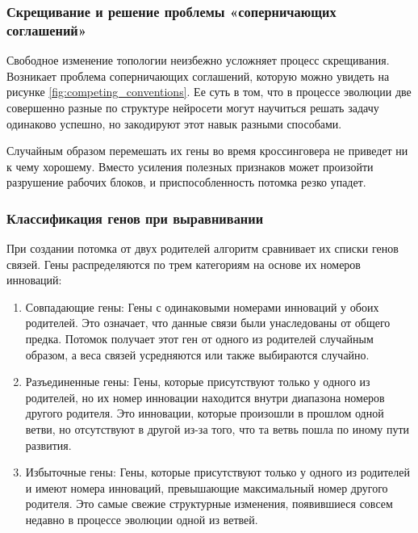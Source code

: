 \subsubsection{Скрещивание и решение проблемы «соперничающих соглашений»}



Свободное изменение топологии неизбежно усложняет процесс скрещивания. Возникает проблема соперничающих соглашений, которую можно увидеть на рисунке \ref{fig:competing_conventions}. Ее суть в том, что в процессе эволюции две совершенно разные по структуре нейросети могут научиться решать задачу одинаково успешно, но закодируют этот навык разными способами.

Случайным образом перемешать их гены во время кроссинговера не приведет ни к чему хорошему. Вместо усиления полезных признаков может произойти разрушение рабочих блоков, и приспособленность потомка резко упадет.

\subsubsection{Классификация генов при выравнивании}

При создании потомка от двух родителей алгоритм сравнивает их списки генов связей. Гены распределяются по трем категориям на основе их номеров инноваций:

\begin{enumerate}

  \item Совпадающие гены: Гены с одинаковыми номерами инноваций у обоих родителей. Это означает, что данные связи были унаследованы от общего предка. Потомок получает этот ген от одного из родителей случайным образом, а веса связей усредняются или также выбираются случайно.

  \item Разъединенные гены: Гены, которые присутствуют только у одного из родителей, но их номер инновации находится внутри диапазона номеров другого родителя. Это инновации, которые произошли в прошлом одной ветви, но отсутствуют в другой из-за того, что та ветвь пошла по иному пути развития.

  \item Избыточные гены: Гены, которые присутствуют только у одного из родителей и имеют номера инноваций, превышающие максимальный номер другого родителя. Это самые свежие структурные изменения, появившиеся совсем недавно в процессе эволюции одной из ветвей.

\end{enumerate}

